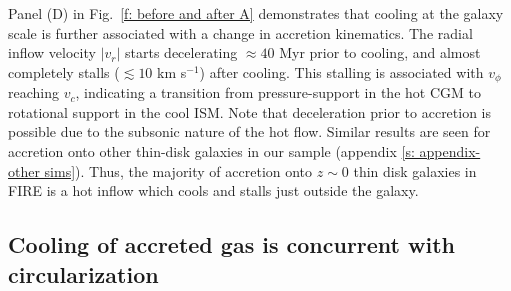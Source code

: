 \documentclass[fleqn,usenatbib]{mnras}
\newcommand{\Rcon}{R_{T=10^5\,{\rm K}}}
\begin{document}
Panel (D) in Fig.~\ref{f: before and after A} demonstrates that cooling at the galaxy scale is further associated with a change in accretion kinematics.
The radial inflow velocity $\vert v_r \vert $ starts decelerating $\approx40$ Myr prior to cooling, and almost completely stalls ($\lesssim10$ km s$^{-1}$) after cooling.
This stalling is associated with $v_\phi$ reaching $v_c$, indicating a transition from pressure-support in the hot CGM to rotational support in the cool ISM.
Note that deceleration prior to accretion is possible due to the subsonic nature of the hot flow.
Similar results are seen for accretion onto other thin-disk galaxies in our sample (appendix \ref{s: appendix-other sims}).
Thus, the majority of accretion onto $z\sim0$ thin disk galaxies in FIRE is a hot inflow which cools and stalls just outside the galaxy. 




\subsection{Cooling of accreted gas is concurrent with circularization}
\label{s: characteristics -- aligns}
\end{document}
